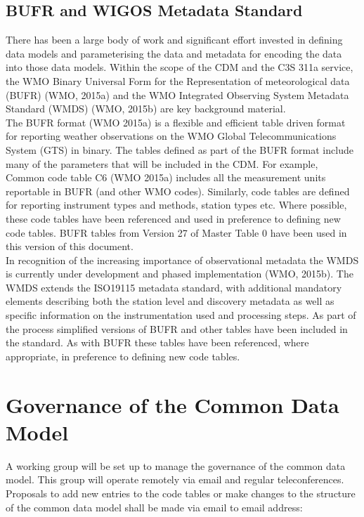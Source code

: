 \documentclass[a4paper,12pt]{article}
\begin{document}


\subsection {BUFR and WIGOS Metadata Standard}
There has been a large body of work and significant effort invested in defining data models and parameterising the data and metadata for encoding the data into those data models.  Within the scope of the CDM and the C3S 311a service, the WMO Binary Universal Form for the Representation of meteorological data (BUFR) (WMO, 2015a) and the WMO Integrated Observing System Metadata Standard (WMDS) (WMO, 2015b) are key background material. \\

The BUFR format (WMO 2015a) is a flexible and efficient table driven format for reporting weather observations on the WMO Global Telecommunications System (GTS) in binary. The tables defined as part of the BUFR format include many of the parameters that will be included in the CDM. For example, Common code table C6 (WMO 2015a) includes all the measurement units reportable in BUFR (and other WMO codes). Similarly, code tables are defined for reporting instrument types and methods, station types etc. Where possible, these code tables have been referenced and used in preference to defining new code tables.  BUFR tables from Version 27 of Master Table 0 have been used in this version of this document.\\

In recognition of the increasing importance of observational metadata the WMDS is currently under development and phased implementation (WMO, 2015b). The WMDS extends the ISO19115 metadata standard, with additional mandatory elements describing both the station level and discovery metadata as well as specific information on the instrumentation used and processing steps. As part of the process simplified versions of BUFR and other tables have been included in the standard. As with BUFR these tables have been referenced, where appropriate, in preference to defining new code tables.

\section {Governance of the Common Data Model}
A working group will be set up to manage the governance of the common data model. This group will operate remotely via email and regular teleconferences.  Proposals to add new entries to the code tables or make changes to the structure of the common data model shall be made via email to email address:\\
\end{document}
